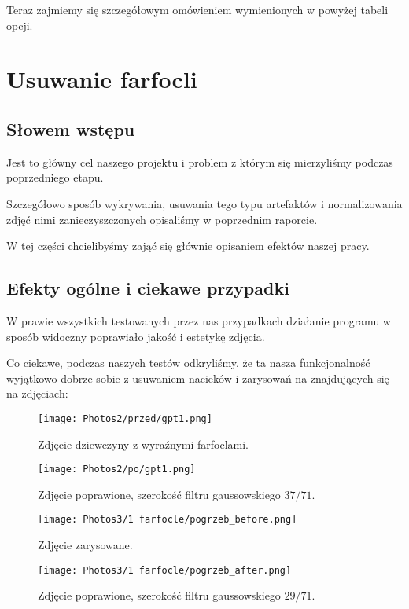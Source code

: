 \documentclass[]{mwart}
\begin{document}
Teraz zajmiemy się szczegółowym omówieniem wymienionych w powyżej tabeli opcji. \newpage






\section{Usuwanie farfocli}

\subsection{Słowem wstępu}
Jest to główny cel naszego projektu i problem z którym się mierzyliśmy podczas poprzedniego etapu.

Szczegółowo sposób wykrywania, usuwania tego typu artefaktów i normalizowania
zdjęć nimi zanieczyszczonych opisaliśmy w poprzednim raporcie.

W tej części chcielibyśmy zająć się głównie opisaniem efektów naszej pracy.

\subsection{Efekty ogólne i ciekawe przypadki}
W prawie wszystkich testowanych przez nas przypadkach działanie programu w sposób widoczny poprawiało jakość i estetykę zdjęcia.

Co ciekawe, podczas naszych testów odkryliśmy, że ta nasza funkcjonalność
wyjątkowo dobrze sobie z usuwaniem nacieków i zarysowań na znajdujących się na zdjęciach:

\newpage

\begin{figure}[H]
    \centering
    \texttt{[image: Photos2/przed/gpt1.png]}
    \caption{Zdjęcie dziewczyny z wyraźnymi farfoclami.}
\end{figure}
\begin{figure}[H]
    \centering
    \texttt{[image: Photos2/po/gpt1.png]}
    \caption{Zdjęcie poprawione, szerokość filtru gaussowskiego $37/71$.}
\end{figure}

\begin{figure}[H]
    \centering
    \texttt{[image: Photos3/1 farfocle/pogrzeb\_before.png]}
    \caption{Zdjęcie zarysowane.}
\end{figure}
\begin{figure}[H]
    \centering
    \texttt{[image: Photos3/1 farfocle/pogrzeb\_after.png]}
    \caption{Zdjęcie poprawione, szerokość filtru gaussowskiego $29/71$.}
\end{figure}
\end{document}

